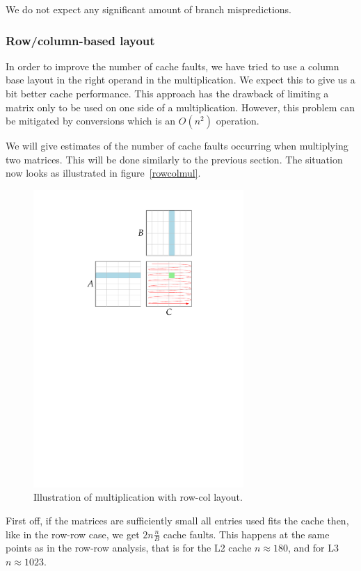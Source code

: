 We do not expect any significant amount of branch mispredictions.

\subsubsection{Row/column-based layout}
In order to improve the number of cache faults, we have tried to use a
column base layout in the right operand in the multiplication. We
expect this to give us a bit better cache performance. This approach
has the drawback of limiting a matrix only to be used on one side of a
multiplication. However, this problem can be mitigated by conversions
which is an $O(n^2)$ operation.

We will give estimates of the number of cache faults occurring when
multiplying two matrices. This will be done similarly to the previous
section. The situation now looks as illustrated in
figure~\ref{rowcolmul}.
\begin{figure}[h!]
  \centering
  \includegraphics[width=8cm]{images/rowcolmul}
  \caption{Illustration of multiplication with row-col layout.}
  \label{fig:colowmul}
\end{figure}

First off, if the matrices are sufficiently small all entries used
fits the cache then, like in the row-row case, we get $2n\frac{n}{B}$
cache faults. This happens at the same points as in the row-row
analysis, that is for the L2 cache $n \approx 180$, and for L3 $n
\approx 1023$.

